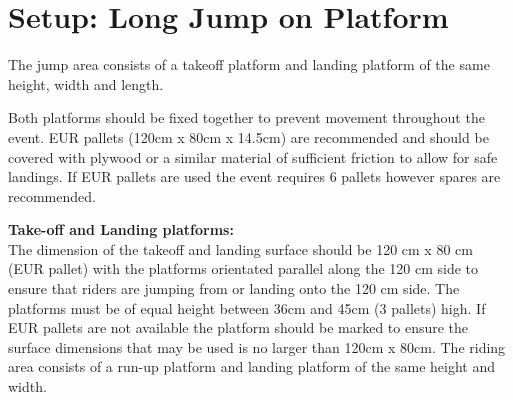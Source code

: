 \section{Setup: Long Jump on Platform}
The jump area consists of a takeoff platform and landing platform of the same height, width and length.

Both platforms should be fixed together to prevent movement throughout the event.
EUR pallets (120cm x 80cm x 14.5cm) are recommended and should be covered with plywood or a similar material of sufficient friction to allow for safe landings.
If EUR pallets are used the event requires 6 pallets however spares are recommended.

\textbf{Take-off and Landing platforms:}\\
The dimension of the takeoff and landing surface should be 120 cm x 80 cm (EUR pallet) with the platforms orientated parallel along the 120 cm side to ensure that riders are jumping from or landing onto the 120 cm side.
The platforms must be of equal height between 36cm and 45cm (3 pallets) high.
If EUR pallets are not available the platform should be marked to ensure the surface dimensions that may be used is no larger than 120cm x 80cm.
The riding area consists of a run-up platform and landing platform of the same height and width.
